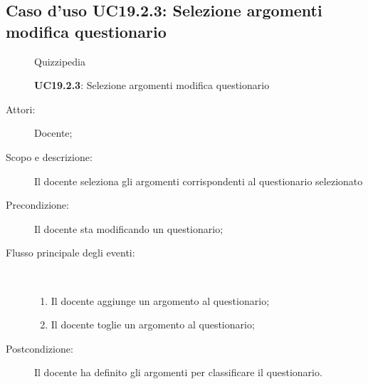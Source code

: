 \subsection{Caso d'uso UC19.2.3: Selezione argomenti modifica questionario}
	\begin{figure}[H]
		\centering
		\begin{resizedtikzpicture}{\textwidth}
		\begin{umlsystem}[x=0, fill=lightgray!20]{Quizzipedia}
		\end{umlsystem}
		\end{resizedtikzpicture}
		\caption{\textbf{UC19.2.3}: Selezione argomenti modifica questionario}
		\label{UC19.2.3}
	\end{figure}
\begin{description}
\item[Attori:] Docente;
\item[Scopo e descrizione:] Il docente seleziona gli argomenti corrispondenti al questionario selezionato
      \item[Precondizione:] Il docente sta modificando un questionario;

        \item[Flusso principale degli eventi:] \ 
 \begin{enumerate}
          \item Il docente aggiunge un argomento al questionario;
          \item Il docente toglie un argomento al questionario;

      \end{enumerate}
    \item[Postcondizione:] Il docente ha definito gli argomenti per classificare il questionario.
  \end{description}
\hypertarget{UC19.3}{}
